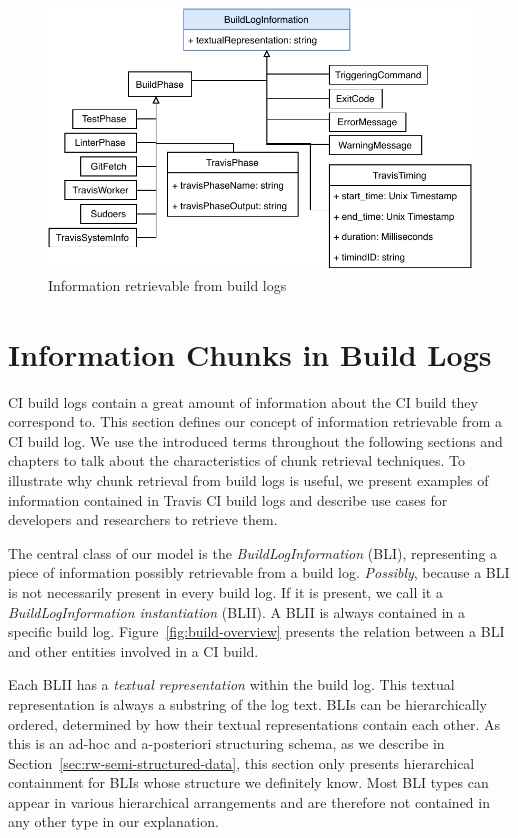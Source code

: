 \documentclass[\myrootdir/main.tex]{subfiles}
\begin{document}
\begin{figure}[htbp]
	\centering
	\includegraphics[width=\textwidth, clip]{img/build-log-information.pdf}
	\caption{Information retrievable from build logs}
	\label{fig:build-log-information}
\end{figure}

\section{Information Chunks in Build Logs}
\label{sec:bli}
CI build logs contain a great amount of information about the CI build they correspond to.
This section defines our concept of information retrievable from a CI build log.
We use the introduced terms throughout the following sections and chapters to talk about the characteristics of chunk retrieval techniques.
To illustrate why chunk retrieval from build logs is useful, we present examples of information contained in Travis CI build logs and describe use cases for developers and researchers to retrieve them.

The central class of our model is the \emph{BuildLogInformation} (BLI), representing a piece of information possibly retrievable from a build log.
\emph{Possibly}, because a BLI is not necessarily present in every build log.
If it is present, we call it a \emph{BuildLogInformation instantiation} (BLII).
A BLII is always contained in a specific build log.
Figure~\ref{fig:build-overview} presents the relation between a BLI and other entities involved in a CI build.

Each BLII has a \emph{textual representation} within the build log.
This textual representation is always a substring of the log text.
BLIs can be hierarchically ordered, determined by how their textual representations contain each other.
As this is an ad-hoc and a-posteriori structuring schema, as we describe in Section~\ref{sec:rw-semi-structured-data}, this section only presents hierarchical containment for BLIs whose structure we definitely know.
Most BLI types can appear in various hierarchical arrangements and are therefore not contained in any other type in our explanation.
\end{document}
